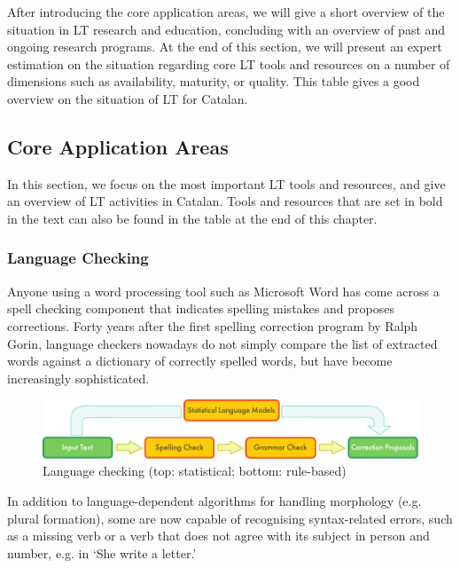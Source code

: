 \begin{multicols}{2}
After introducing the core application areas, we will give a short overview of the situation in LT research and education, concluding with an overview of past and ongoing research programs. At the end of this section, we will present an expert estimation on the situation regarding core LT tools and resources on a number of dimensions such as availability, maturity, or quality. This table gives a good overview on the situation of LT for Catalan.

\subsection{Core Application Areas}

    In this section, we focus on the most important LT tools and resources, and give an overview of LT activities in Catalan. Tools and resources that are set in bold in the text can also be found in the table at the end of this chapter.

\subsubsection{Language Checking}

Anyone using a word processing tool such as Microsoft Word has come across a spell checking component that indicates spelling mistakes and proposes corrections. Forty years after the first spelling correction program by Ralph Gorin, language checkers nowadays do not simply compare the list of extracted words against a dictionary of correctly spelled words, but have become increasingly sophisticated. 

\begin{figure}[htb]
  \center
  \includegraphics[width=\textwidth]{../_media/english/language_checking}
  \caption{Language checking (top: statistical; bottom: rule-based)}
  \label{fig:langcheckingaarch_en}
\end{figure}

In addition to language-dependent algorithms for handling morphology (e.g. plural formation), some are now capable of recognising syntax-related errors, such as a missing verb or a verb that does not agree with its subject in person and number, e.g. in ‘She write a letter.’ 


\end{multicols}
